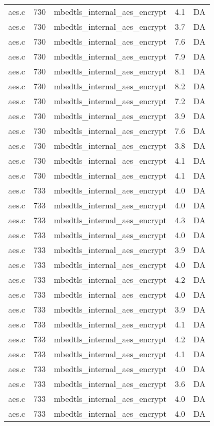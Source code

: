 \begin{table}[h!]
\begin{tabular}{lrlrr}
aes.c& 730&mbedtls\_internal\_aes\_encrypt&4.1 &DA\\
aes.c& 730&mbedtls\_internal\_aes\_encrypt&3.7 &DA\\
aes.c& 730&mbedtls\_internal\_aes\_encrypt&7.6 &DA\\
aes.c& 730&mbedtls\_internal\_aes\_encrypt&7.9 &DA\\
aes.c& 730&mbedtls\_internal\_aes\_encrypt&8.1 &DA\\
aes.c& 730&mbedtls\_internal\_aes\_encrypt&8.2 &DA\\
aes.c& 730&mbedtls\_internal\_aes\_encrypt&7.2 &DA\\
aes.c& 730&mbedtls\_internal\_aes\_encrypt&3.9 &DA\\
aes.c& 730&mbedtls\_internal\_aes\_encrypt&7.6 &DA\\
aes.c& 730&mbedtls\_internal\_aes\_encrypt&3.8 &DA\\
aes.c& 730&mbedtls\_internal\_aes\_encrypt&4.1 &DA\\
aes.c& 730&mbedtls\_internal\_aes\_encrypt&4.1 &DA\\
aes.c& 733&mbedtls\_internal\_aes\_encrypt&4.0 &DA\\
aes.c& 733&mbedtls\_internal\_aes\_encrypt&4.0 &DA\\
aes.c& 733&mbedtls\_internal\_aes\_encrypt&4.3 &DA\\
aes.c& 733&mbedtls\_internal\_aes\_encrypt&4.0 &DA\\
aes.c& 733&mbedtls\_internal\_aes\_encrypt&3.9 &DA\\
aes.c& 733&mbedtls\_internal\_aes\_encrypt&4.0 &DA\\
aes.c& 733&mbedtls\_internal\_aes\_encrypt&4.2 &DA\\
aes.c& 733&mbedtls\_internal\_aes\_encrypt&4.0 &DA\\
aes.c& 733&mbedtls\_internal\_aes\_encrypt&3.9 &DA\\
aes.c& 733&mbedtls\_internal\_aes\_encrypt&4.1 &DA\\
aes.c& 733&mbedtls\_internal\_aes\_encrypt&4.2 &DA\\
aes.c& 733&mbedtls\_internal\_aes\_encrypt&4.1 &DA\\
aes.c& 733&mbedtls\_internal\_aes\_encrypt&4.0 &DA\\
aes.c& 733&mbedtls\_internal\_aes\_encrypt&3.6 &DA\\
aes.c& 733&mbedtls\_internal\_aes\_encrypt&4.0 &DA\\
aes.c& 733&mbedtls\_internal\_aes\_encrypt&4.0 &DA\\

\end{tabular}
\end{table}
